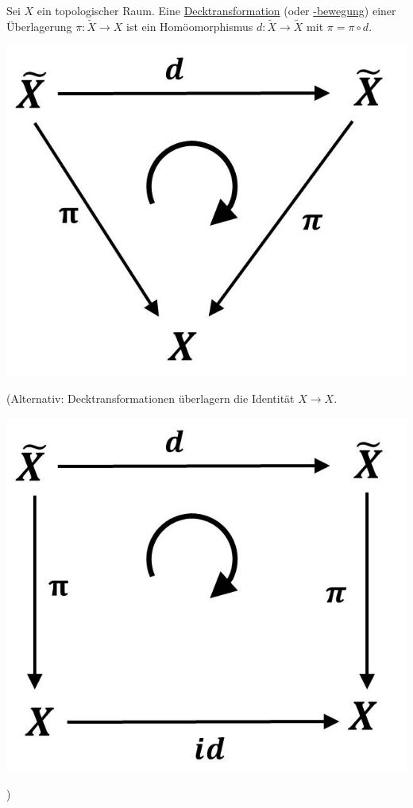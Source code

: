 \documentclass[a4paper,11pt,notitlepage]{report}
\theoremstyle{definition}
\begin{document}
\begin{definition}[Decktransformation]
	Sei $X$ ein topologischer Raum. Eine \underline{Decktransformation} (oder \underline{-bewegung}) einer Überlagerung $\pi \colon \widetilde{X} \rightarrow X$ ist ein Homöomorphismus $d \colon \widetilde{X} \rightarrow \widetilde{X}$ mit $\pi = \pi \circ d$. \begin{center}
	\includegraphics[scale=0.5]{images/2012_01_09_Bild2.jpg}
\end{center}
	(Alternativ: Decktransformationen überlagern die Identität $X \rightarrow X$. \begin{center}
	\includegraphics[scale=0.5]{images/2012_01_09_Bild3.jpg}
\end{center})
\end{definition}
\end{document}

